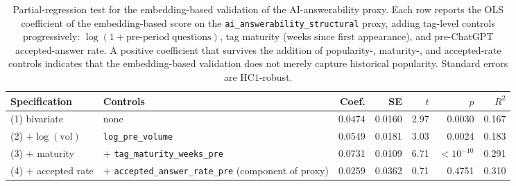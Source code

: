 \begin{table}[ht]
\centering
\caption{Partial-regression test for the embedding-based validation of the
AI-answerability proxy. Each row reports the OLS coefficient of the
embedding-based score on the
\texttt{ai\_answerability\_structural} proxy,
adding tag-level controls progressively: $\log(1+\text{pre-period}\;
\text{questions})$, tag maturity (weeks since first appearance), and
pre-ChatGPT accepted-answer rate. A positive coefficient that survives
the addition of popularity-, maturity-, and accepted-rate controls
indicates that the embedding-based validation does not merely capture
historical popularity. Standard errors are $\text{HC1}$-robust.}
\label{tab:embedding_partial_regression}
\footnotesize
\setlength{\tabcolsep}{4pt}
\begin{adjustbox}{max width=\textwidth}
\begin{tabular}{llrrrrr}
\toprule
Specification & Controls & Coef. & SE & $t$ & $p$ & $R^2$ \\
\midrule
(1) bivariate          & none                                                           & 0.0474 & 0.0160 & 2.97 & 0.0030 & 0.167 \\
(2) $+ \log(\text{vol})$ & \texttt{log\_pre\_volume}                                    & 0.0549 & 0.0181 & 3.03 & 0.0024 & 0.183 \\
(3) $+$ maturity       & + \texttt{tag\_maturity\_weeks\_pre}                           & 0.0731 & 0.0109 & 6.71 & $<10^{-10}$ & 0.291 \\
(4) $+$ accepted rate  & + \texttt{accepted\_answer\_rate\_pre} (component of proxy)    & 0.0259 & 0.0362 & 0.71 & 0.4751 & 0.310 \\
\bottomrule
\end{tabular}
\end{adjustbox}
\end{table}

